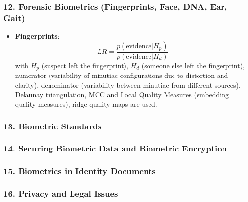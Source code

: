 \documentclass[a4paper]{article}
\begin{document}
    \subsubsection*{12. Forensic Biometrics (Fingerprints, Face, DNA, Ear, Gait)}
    \begin{itemize}
      \item \textbf{Fingerprints}: $$LR = \frac{p(\text{evidence}|H_p)}{p(\text{evidence}|H_d)}$$
      with $H_p$ (suspect left the fingerprint), $H_d$ (someone else left the fingerprint), numerator (variability of minutiae configurations due to distortion and clarity), denominator (variability between minutiae from different sources). Delaunay triangulation, MCC and Local Quality Measures (embedding quality measures), ridge quality maps are used.
    \end{itemize}
    \subsubsection*{13. Biometric Standards}
    \subsubsection*{14. Securing Biometric Data and Biometric Encryption}
    \subsubsection*{15. Biometrics in Identity Documents}
    \subsubsection*{16. Privacy and Legal Issues}
\end{document}
